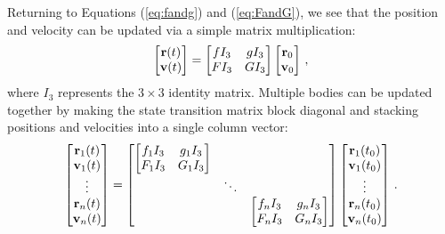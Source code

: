 Returning to Equations (\ref{eq:fandg}) and (\ref{eq:FandG}), we see that the position and velocity can be updated via a simple matrix multiplication:
\begin{equation}
\left[\begin{matrix} \mathbf r(t) \\ \mathbf v(t) \end{matrix} \right] = \left[\begin{matrix} f I_3 & g I_3 \\ F I_3 & G I_3\end{matrix} \right]\left[\begin{matrix} \mathbf r_0 \\  \mathbf v_0 \end{matrix} \right] \,,
\end{equation}
where $I_3$ represents the $3\times3$ identity matrix.  Multiple bodies can be updated together by making the state transition matrix block diagonal and stacking positions and velocities into a single column vector:
\begin{equation}\label{eq:stackedState}
\left[\begin{matrix} \mathbf r_1(t) \\ \mathbf v_1(t) \\ \vdots \\   \mathbf r_n(t) \\ \mathbf v_n(t)\end{matrix} \right] =
\left[\begin{matrix} 
\left[\begin{matrix}f_1 I_3 & g_1 I_3 \\ 
F_1 I_3 & G_1 I_3\end{matrix} \right] & &\\
&  \ddots &  \\
& &\left[\begin{matrix} f_n I_3 & g_n I_3   \\ 
F_n I_3 & G_n I_3 \end{matrix} \right]
\end{matrix} \right]\left[\begin{matrix}  \mathbf r_1(t_0) \\ \mathbf v_1(t_0) \\ \vdots \\   \mathbf r_n(t_0) \\ \mathbf v_n(t_0)\end{matrix} \right] \,.
\end{equation}

